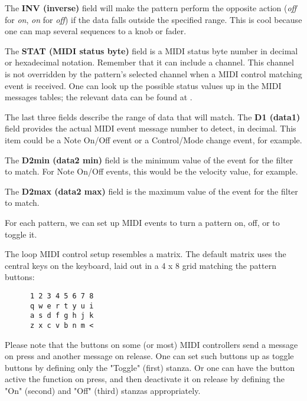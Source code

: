    The \textbf{INV (inverse)} field will make the pattern perform the opposite
   action (\textsl{off} for \textsl{on}, \textsl{on} for \textsl{off}) if the
   data falls outside the specified range.  This is cool because one can map
   several sequences to a knob or fader.

   The \textbf{STAT (MIDI status byte)} field is a MIDI status byte number in
   decimal or hexadecimal notation.
   Remember that it can include a channel.  This channel is not overridden by
   the pattern's selected channel when a MIDI control matching event is
   received. 
   One can look up the possible status values up in the MIDI messages tables;
   the relevant data can be found at \cite{midicontroltable}.

   The last three fields describe the range of data that will match.  The
   \textbf{D1 (data1)} field provides the actual MIDI event message number to
   detect, in decimal.  This item could be a Note On/Off event or a
   Control/Mode change event, for example.

   The \textbf{D2min (data2 min)} field is the minimum value of the event for
   the filter to match. For Note On/Off events, this would be the velocity
   value, for example.

   The \textbf{D2max (data2 max)} field is the maximum value of the event for
   the filter to match.


   For each pattern, we can set up MIDI events to turn a 
   pattern on, off, or to toggle it.

   The loop MIDI control setup resembles a matrix.  The default matrix
   uses the central keys on the keyboard, laid out in a 4 x 8 grid matching the
   pattern buttons:

   \begin{verbatim}
      1 2 3 4 5 6 7 8
      q w e r t y u i
      a s d f g h j k
      z x c v b n m <
   \end{verbatim}

   Please note that the buttons on some (or most) MIDI controllers send a
   message on press and another message on release.  One can set such buttons
   up as toggle buttons by defining only the "Toggle" (first) stanza.
   Or one can have the button active the function on press, and then deactivate
   it on release by defining the "On" (second) and "Off" (third) stanzas
   appropriately.

